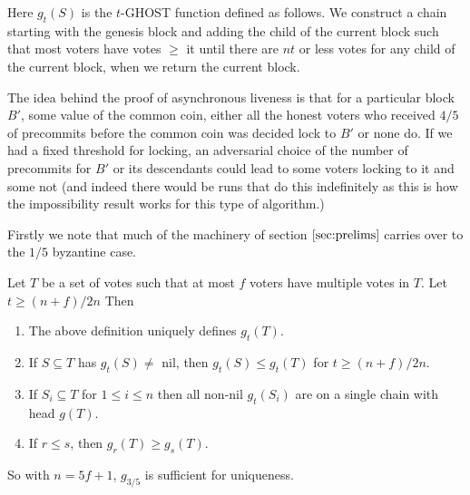 \documentclass[a4paper,UKenglish,cleveref, autoref, thm-restate, anonymous]{lipics-v2019}
\begin{document}
{Here $g_{t}(S)$ is the $t$-GHOST function defined as follows. We construct a chain starting with the genesis block and adding the child of the current block such that most voters have votes $\geq$ it until there are $nt$ or less votes for any child of the current block, when we return the current block.

The idea behind the proof of asynchronous liveness is that for a particular block $B'$, some value of the common coin, either all the honest voters who received $4/5$ of precommits before the common coin was decided lock to $B'$ or none do.
If we had a fixed threshold for locking, an adversarial choice of the number of precommits for $B'$ or its descendants could lead to some voters locking to it and some not (and indeed there would be runs that do this indefinitely as this is how the impossibility result works for this type of algorithm.)

Firstly we note that much of the machinery of section $\ref{sec:prelims}$ carries over to the $1/5$ byzantine case.

\begin{lemma} \label{lem:ghost-monotonicity-general}
Let $T$ be a set of votes such that at most $f$ voters have multiple votes in $T$. Let $t \geq (n+f)/2n$ Then
\begin{enumerate}
\item The above definition uniquely defines $g_t(T)$.
\item If $S \subseteq T$ has $g_t(S) \neq$ nil, then $g_t(S) \leq g_t(T)$ for $t \geq (n+f)/2n$.
\item If $S_i \subseteq T$ for $1 \leq i \leq n$ then all non-nil $g_t(S_i)$ are on a single chain with head $g(T)$.
\item If $r \leq s$, then $g_r(T) \geq g_s(T)$.
\end{enumerate}
\end{lemma}
So with $n=5f+1$, $g_{3/5}$ is sufficient for uniqueness.

}
\end{document}
